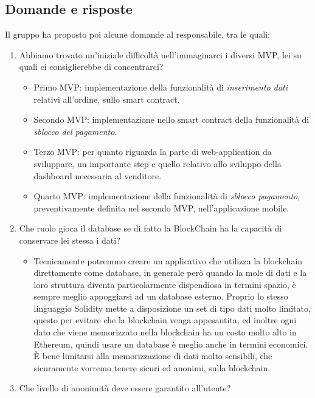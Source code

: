 \subsection{Domande e risposte}
Il gruppo ha proposto poi alcune domande al responsabile, tra le quali:
\begin{enumerate}
    \item Abbiamo trovato un'iniziale difficoltà nell'immaginarci i diversi MVP, lei su quali ci consiglierebbe di concentrarci?
          \begin{itemize}
              \item Primo MVP: implementazione della funzionalità di \textit{inserimento dati} relativi all'ordine, sullo smart contract.
              \item Secondo MVP: implementazione nello smart contract della funzionalità di \textit{sblocco del pagamento}.
              \item Terzo MVP: per quanto riguarda la parte di web-application da sviluppare, un importante step e quello relativo allo sviluppo della
                    dashboard necessaria al venditore.
              \item Quarto MVP: implementazione della funzionalità di \textit{sblocco pagamento}, preventivamente definita nel secondo MVP, nell'applicazione
                    mobile.
            \end{itemize}
    \item Che ruolo gioca il database se di fatto la BlockChain ha la capacità di conservare lei stessa i dati?
            \begin{itemize}
                \item Tecnicamente potremmo creare un applicativo che utilizza la blockchain direttamente come database, in generale però quando la mole di dati
                      e la loro struttura diventa particolarmente dispendiosa in termini spazio, è sempre meglio appoggiarsi ad un database esterno. 
                      Proprio lo stesso linguaggio Solidity mette a disposizione un set di tipo dati molto limitato, questo per evitare che la blockchain venga appesantita, ed
                      inoltre ogni dato che viene memorizzato nella blockchain ha un costo molto alto in Ethereum, quindi usare un database è meglio anche in termini economici.
                      È bene limitarsi alla memorizzazione di dati molto sensibili, che sicuramente vorremo tenere sicuri ed anonimi, sulla blockchain.
            \end{itemize}
    \item Che livello di anonimità deve essere garantito all'utente?

\end{enumerate}
